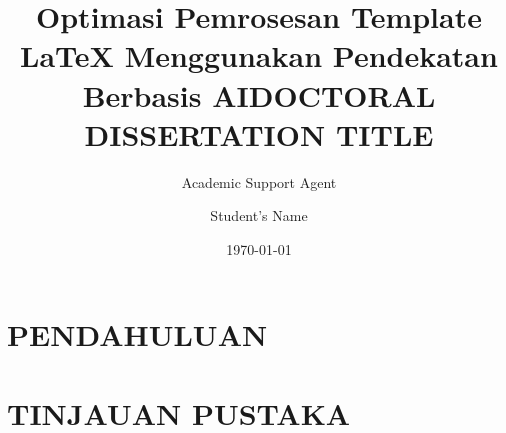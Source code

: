 \documentclass{thesistemplate}
\title{Optimasi Pemrosesan Template LaTeX Menggunakan Pendekatan Berbasis AI}
\author{Academic Support Agent}
\date{\today}
\begin{document}
\maketitle

\begin{abstract}

\end{abstract}

\chapter{PENDAHULUAN}


\chapter{TINJAUAN PUSTAKA}


\setdefaultlanguage{english} 
\usepackage{tabu}
\usepackage{mathtools, nccmath}
\usepackage{fontspec}
\usepackage{array,booktabs}
\usepackage{lipsum}
\usepackage{textcomp}
\usepackage{multirow}
\usepackage{makecell}
\usepackage{booktabs}
\usepackage{rotating}
\usepackage{algorithm}
\usepackage{algorithmic}
\usepackage{tabularx,booktabs}
\usepackage[backend=biber, style=ieee, isbn=false, sorting=none]{biblatex} 


\newcommand*{\figref}[2][]{%
	\hyperref[{#2}]{%
		\ref*{#2}%
		\ifx\\#1\\%
		\else
		#1%
		\fi
	}%
}

\hypersetup{
	colorlinks,
	citecolor=blue,
	linkcolor=blue,
	urlcolor=blue
}
\title{DOCTORAL DISSERTATION TITLE} 

\author{Student's Name} 

\end{document}
